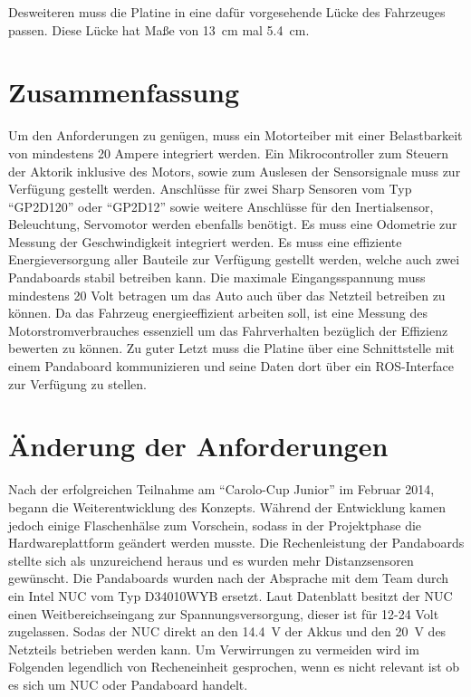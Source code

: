 Desweiteren muss die Platine in eine dafür vorgesehende Lücke des Fahrzeuges passen. Diese Lücke hat Maße von \SI{13}{\cm} mal \SI{5,4}{\cm}.


\section{Zusammenfassung}
Um den Anforderungen zu genügen, muss ein Motorteiber mit einer Belastbarkeit von mindestens 20 Ampere integriert werden. 
Ein Mikrocontroller zum Steuern der Aktorik inklusive des Motors, sowie zum Auslesen der Sensorsignale muss zur Verfügung gestellt werden. 
Anschlüsse für zwei Sharp Sensoren vom Typ ``GP2D120'' oder ``GP2D12'' sowie weitere Anschlüsse für den Inertialsensor, Beleuchtung, Servomotor werden ebenfalls benötigt. 
Es muss eine Odometrie zur Messung der Geschwindigkeit integriert werden.
Es muss eine effiziente Energieversorgung aller Bauteile zur Verfügung gestellt werden, welche auch zwei Pandaboards stabil betreiben kann. Die maximale Eingangsspannung
muss mindestens 20 Volt betragen um das Auto auch über das Netzteil betreiben zu können.
Da das Fahrzeug energieeffizient arbeiten soll, ist eine Messung des Motorstromverbrauches essenziell um das Fahrverhalten bezüglich der Effizienz bewerten zu können.
Zu guter Letzt muss die Platine über eine Schnittstelle mit einem Pandaboard kommunizieren und seine Daten dort über ein ROS-Interface zur Verfügung zu stellen.

\section{Änderung der Anforderungen}
Nach der erfolgreichen Teilnahme am ``Carolo-Cup Junior'' im Februar 2014, begann die Weiterentwicklung des Konzepts. Während der Entwicklung kamen jedoch
einige Flaschenhälse zum Vorschein, sodass in der Projektphase die Hardwareplattform geändert werden musste. Die Rechenleistung der Pandaboards stellte sich
als unzureichend heraus und es wurden mehr Distanzsensoren gewünscht. Die Pandaboards wurden nach der Absprache mit dem Team durch ein Intel NUC vom Typ
D34010WYB ersetzt. Laut Datenblatt \cite{datasheet-nuc} besitzt der NUC einen Weitbereichseingang zur Spannungsversorgung, dieser ist für 12-24 Volt zugelassen.
Sodas der NUC direkt an den \SI{14,4}{\V} der Akkus und den \SI{20}{\V} des Netzteils betrieben werden kann. Um Verwirrungen zu vermeiden wird im Folgenden legendlich 
von Recheneinheit gesprochen, wenn es nicht relevant ist ob es sich um NUC oder Pandaboard handelt.
